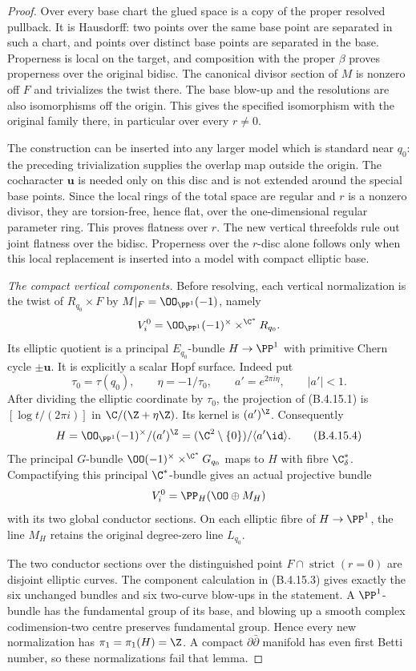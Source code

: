 \begin{proof}
Over every base chart the glued space is a copy of the
proper resolved pullback. It is Hausdorff: two points
over the same base point are separated in such a chart,
and points over distinct base points are separated in
the base. Properness is local on the target, and
composition with the proper $\beta$ proves properness
over the original bidisc. The canonical divisor section
of $M$ is nonzero off $F$ and trivializes the twist there.
The base blow-up and the resolutions are also
isomorphisms off the origin. This gives the specified
isomorphism with the original family there, in particular
over every $r\ne0$.

The construction can be inserted into any larger model
which is standard near $q_0$: the preceding
trivialization supplies the overlap map outside the
origin. The cocharacter $\mathbf u$ is needed only on
this disc and is not extended around the special base
points. Since the local rings of the total space are
regular and $r$ is a nonzero divisor, they are
torsion-free, hence flat, over the one-dimensional
regular parameter ring. This proves flatness over $r$.
The new vertical threefolds rule out joint flatness over
the bidisc. Properness over the $r$-disc alone follows
only when this local replacement is inserted into a
model with compact elliptic base.

\emph{The compact vertical components.}
Before resolving, each vertical normalization is the
twist of $R_{q_0}\times F$ by
$M|_F=\OO_{\PP^1}(-1)$, namely
\[
 V_i^0=\OO_{\PP^1}(-1)^\times
                    \mathbin{\times^{\C^*}}R_{q_0}.
\]
Its elliptic quotient is a principal $E_{q_0}$-bundle
$H\to\PP^1$ with primitive Chern cycle
$\pm\mathbf u$. It is explicitly a scalar Hopf surface.
Indeed put
\[
 \tau_0=\tau(q_0),\qquad
 \eta=-1/\tau_0,\qquad a'=e^{2\pi i\eta},
 \qquad |a'|<1.
\]
After dividing the elliptic coordinate by $\tau_0$,
the projection of (B.4.15.1) is
$[\log t/(2\pi i)]$ in $\C/(\Z+\eta\Z)$.
Its kernel is $(a')^\Z$. Consequently
\[
 H=\OO_{\PP^1}(-1)^\times/(a')^\Z
   =(\C^2\setminus\{0\})/\langle a'\id\rangle.
 \tag{B.4.15.4}
\]
The principal $G$-bundle
$\OO(-1)^\times\mathbin{\times^{\C^*}}G_{q_0}$
maps to $H$ with fibre $\C^*_{\delta}$.
Compactifying this principal $\C^*$-bundle gives an
actual projective bundle
\[
 V_i^0=\PP_H(\OO\oplus M_H)
\]
with its two global conductor sections. On each
elliptic fibre of $H\to\PP^1$, the line $M_H$ retains
the original degree-zero line $L_{q_0}$.

The two conductor sections over the distinguished point
$F\cap\operatorname{strict}(r=0)$ are disjoint elliptic
curves. The component calculation in (B.4.15.3) gives
exactly the six unchanged bundles and six two-curve
blow-ups in the statement. A $\PP^1$-bundle has the
fundamental group of its base, and blowing up a smooth
complex codimension-two centre preserves fundamental
group. Hence every new normalization has
$\pi_1=\pi_1(H)=\Z$. A compact
$\partial\bar\partial$ manifold has even first Betti
number, so these normalizations fail that lemma.


\end{proof}
